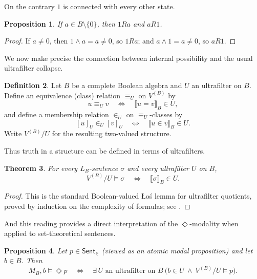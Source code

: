 \documentclass[11pt]{amsart}
\theoremstyle{definition}
\newtheorem{definition}{Definition}[section]
\theoremstyle{plain}
\newtheorem{theorem}[definition]{Theorem}
\newtheorem{proposition}[definition]{Proposition}
\newcommand{\Sent}{\mathsf{Sent}}
\newcommand{\LB}{L_B}     %
\newcommand{\val}[1]{\llbracket #1\rrbracket_B}
\begin{document}
On the contrary $1$ is connected with every other state.

\begin{proposition}\label{prop:1-related}
If $a\in B\setminus\{0\}$, then $1Ra$ and $aR1$.
\end{proposition}

\begin{proof}
If $a\neq 0$, then $1\wedge a=a\neq 0$, so $1Ra$; and $a\wedge 1=a\neq 0$, so $aR1$.
\end{proof}

We now make precise the connection between internal possibility and the usual ultrafilter collapse.

\begin{definition}\label{def:ultrafilter-quotient}
Let $B$ be a complete Boolean algebra and $U$ an ultrafilter on $B$.
Define an equivalence (class) relation $\equiv_U$ on $V^{(B)}$ by
\[
u\equiv_U v \quad\Longleftrightarrow\quad \val{u=v}\in U,
\]
and define a membership relation $\in_U$ on $\equiv_U$-classes by
\[
[u]_U\in_U [v]_U \quad\Longleftrightarrow\quad \val{u\in v}\in U.
\]
Write $V^{(B)}/U$ for the resulting two-valued structure.
\end{definition}

Thus truth in a structure can be defined in terms of ultrafilters.

\begin{theorem}\label{thm:ultrafilter-truth-lemma}
For every $\LB$-sentence $\sigma$ and every ultrafilter $U$ on $B$,
\[
V^{(B)}/U\models \sigma \quad\Longleftrightarrow\quad \val{\sigma}\in U.
\]
\end{theorem}

\begin{proof}
This is the standard Boolean-valued \L o\'s lemma for ultrafilter quotients, proved by induction on the
complexity of formulas; see \cite{Bell,Jech}.
\end{proof}

And this reading provides a direct interpretation of the $\Diamond$-modality when applied to set-theoretical sentences.

\begin{proposition}\label{prop:diamond-ultrafilter-reading}
Let $p\in\Sent_{\in}$ (viewed as an atomic modal proposition) and let $b\in B$.
Then
\[
M_B,b\models \Diamond p
\quad\Longleftrightarrow\quad
\exists\,U\text{ an ultrafilter on }B\ \bigl(b\in U\ \wedge\ V^{(B)}/U\models p\bigr).
\]
\end{proposition}
\end{document}
